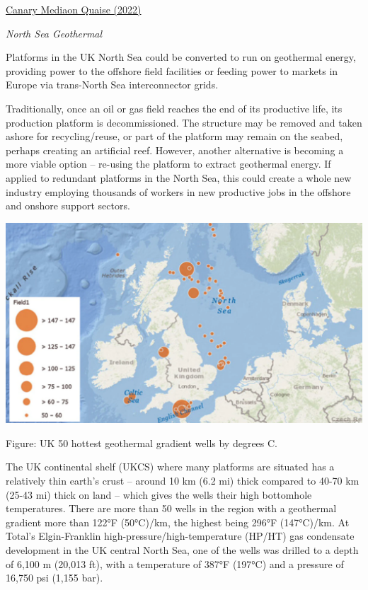 \documentclass[
]{book}
\begin{document}
\href{https://www.canarymedia.com/articles/geothermal/geothermal-startup-quaise-raises-40m-for-ultra-deep-drilling}{Canary Mediaon Quaise (2022)}

\emph{North Sea Geothermal}

Platforms in the UK North Sea could be converted to run on geothermal energy, providing power to the offshore field facilities or feeding power to markets in Europe via trans-North Sea interconnector grids.

Traditionally, once an oil or gas field reaches the end of its productive life, its production platform is decommissioned. The structure may be removed and taken ashore for recycling/reuse, or part of the platform may remain on the seabed, perhaps creating an artificial reef. However, another alternative is becoming a more viable option -- re-using the platform to extract geothermal energy. If applied to redundant platforms in the North Sea, this could create a whole new industry employing thousands of workers in new productive jobs in the offshore and onshore support sectors.

\includegraphics{fig/North_Sea_UK_geothermal.png}

Figure: UK 50 hottest geothermal gradient wells by degrees C.

The UK continental shelf (UKCS) where many platforms are situated has a relatively thin earth's crust -- around 10 km (6.2 mi) thick compared to 40-70 km (25-43 mi) thick on land -- which gives the wells their high bottomhole temperatures. There are more than 50 wells in the region with a geothermal gradient more than 122°F (50°C)/km, the highest being 296°F (147°C)/km. At Total's Elgin-Franklin high-pressure/high-temperature (HP/HT) gas condensate development in the UK central North Sea, one of the wells was drilled to a depth of 6,100 m (20,013 ft), with a temperature of 387°F (197°C) and a pressure of 16,750 psi (1,155 bar).
\end{document}
